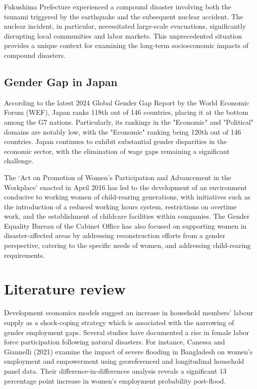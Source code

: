 \documentclass[12pt,halfline,a4paper]{ouparticle}
\begin{document}
Fukushima Prefecture experienced a compound disaster involving both the tsunami triggered by the earthquake and the subsequent nuclear accident. The nuclear incident, in particular, necessitated large-scale evacuations, significantly disrupting local communities and labor markets. This unprecedented situation provides a unique context for examining the long-term socioeconomic impacts of compound disasters.


\subsection{Gender Gap in Japan}
\label{sec5.1}

According to the latest 2024 Global Gender Gap Report by the World Economic Forum (WEF), Japan ranks 118th out of 146 countries, placing it at the bottom among the G7 nations. Particularly, its rankings in the "Economic" and "Political" domains are notably low, with the "Economic" ranking being 120th out of 146 countries. Japan continues to exhibit substantial gender disparities in the economic sector, with the elimination of wage gaps remaining a significant challenge.

The ‘Act on Promotion of Women’s Participation and Advancement in the Workplace’ enacted in April 2016 has led to the development of an environment conducive to working women of child-rearing generations, with initiatives such as the introduction of a reduced working hours system, restrictions on overtime work, and the establishment of childcare facilities within companies. The Gender Equality Bureau of the Cabinet Office has also focused on supporting women in disaster-affected areas by addressing reconstruction efforts from a gender perspective, catering to the specific needs of women, and addressing child-rearing requirements.

\section{Literature review}
\label{sec3}

Development economics models suggest an increase in household members’ labour supply as a shock-coping strategy which is associated with the narrowing of gender employment gaps. Several studies have documented a rise in female labor force participation following natural disasters. For instance, Canessa and Giannelli (2021)\cite{Canessa2021WomensShocks} examine the impact of severe flooding in Bangladesh on women's employment and empowerment using georeferenced and longitudinal household panel data. Their difference-in-differences analysis reveals a significant 13 percentage point increase in women's employment probability post-flood. 
\end{document}
